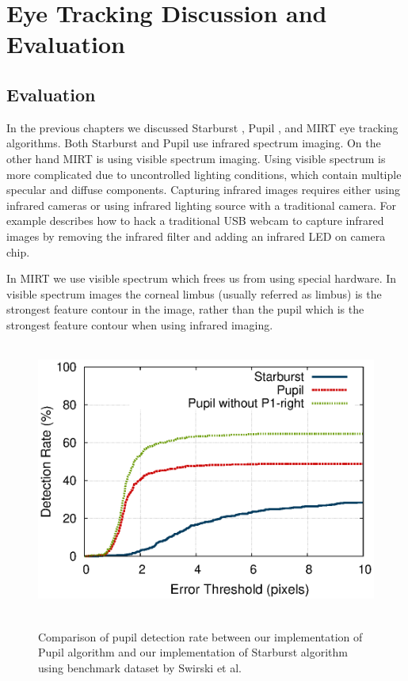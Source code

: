 \chapter{Eye Tracking Discussion and Evaluation} 

\section{Evaluation}
In the previous chapters we discussed Starburst \cite{starburst}, Pupil \cite{pupil}, and MIRT eye tracking algorithms. Both Starburst and Pupil use infrared spectrum imaging. On the other hand MIRT is using visible spectrum imaging. Using visible spectrum is more complicated due to uncontrolled lighting conditions, which contain multiple specular and diffuse components. Capturing infrared images requires either using infrared cameras or using infrared lighting source with a traditional camera. For example \cite{scriptwear} describes  how to hack a traditional USB webcam to capture infrared images by removing the infrared filter and adding an infrared LED on camera chip. \bigskip

In MIRT we use visible spectrum which frees us from using special hardware. In visible spectrum images the corneal limbus (usually referred as limbus) is the strongest feature contour in the image, rather than the pupil which is the strongest feature contour when using infrared imaging. \bigskip

\begin{figure}[!h]
\begin{dBox}
\centering
	\mbox{
		\includegraphics[width=\textwidth]{./Pictures/evaluation/error.eps}
	}
   \caption{Comparison of pupil detection rate between our implementation of Pupil algorithm and our implementation of Starburst algorithm using benchmark dataset by Swirski et al.\label{fig:our_eval} }   
\end{dBox}   
\end{figure}

